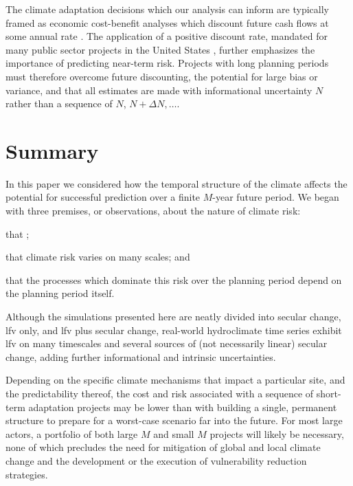 \documentclass[
  draft,
  linenumbers
]{agujournal2018}
\begin{document}
The climate adaptation decisions which our analysis can inform are typically framed as economic cost-benefit analyses which discount future cash flows at some annual rate \citep{sodastrom:1999,powers:2003}.
The application of a positive discount rate, mandated for many public sector projects in the United States \citep{powers:2003}, further emphasizes the importance of predicting near-term risk.
Projects with long planning periods must therefore overcome future discounting, the potential for large bias or variance, and that all estimates are made with informational uncertainty $N$ rather than a sequence of $N$, $N+\Delta N, \ldots$.

\section{Summary}

In this paper we considered how the temporal structure of the climate affects the potential for successful prediction over a finite $M$-year future period.
We began with three premises, or observations, about the nature of climate risk:
\begin{enumerate*}[label= (\roman*)]
  \item that ;
  \item that climate risk varies on many scales; and
  \item that the processes which dominate this risk over the planning period depend on the planning period itself.
\end{enumerate*}
Although the simulations presented here are neatly divided into secular change, \gls{lfv} only, and \gls{lfv} plus secular change, real-world hydroclimate time series exhibit \gls{lfv} on many timescales and several sources of (not necessarily linear) secular change, adding further informational and intrinsic uncertainties.

Depending on the specific climate mechanisms that impact a particular site, and the predictability thereof, the cost and risk associated with a sequence of short-term adaptation projects may be lower than with building a single, permanent structure to prepare for a worst-case scenario far into the future.
For most large actors, a portfolio of both large $M$ and small $M$ projects will likely be necessary, none of which precludes the need for mitigation of global and local climate change and the development or the execution of vulnerability reduction strategies.
\end{document}
